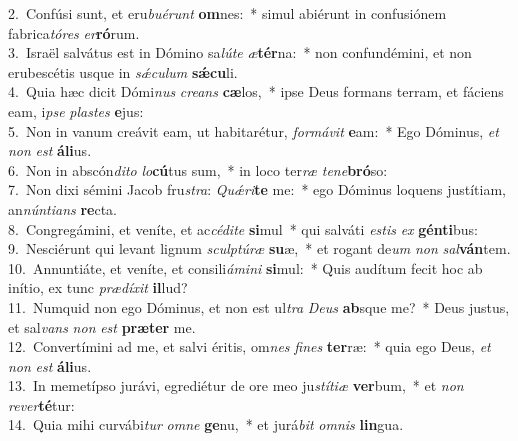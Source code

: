 {2.~}Confúsi sunt, et eru\textit{bu}\textit{é}\textit{runt} \textbf{om}nes:~* simul abiérunt in confusiónem fabrica\textit{tó}\textit{res} \textit{er}\textbf{ró}rum.\\
{3.~}Israël salvátus est in Dómino sa\textit{lú}\textit{te} \textit{æ}\textbf{tér}na:~* non confundémini, et non erubescétis usque in \textit{sǽ}\textit{cu}\textit{lum} \textbf{sǽ}\textbf{cu}li.\\
{4.~}Quia hæc dicit Dómi\textit{nus} \textit{cre}\textit{ans} \textbf{cæ}los,~* ipse Deus formans terram, et fáciens eam, i\textit{pse} \textit{pla}\textit{stes} \textbf{e}jus:\\
{5.~}Non in vanum creávit eam, ut habitarétur, \textit{for}\textit{má}\textit{vit} \textbf{e}am:~* Ego Dóminus, \textit{et} \textit{non} \textit{est} \textbf{á}\textbf{li}us.\\
{6.~}Non in abscón\textit{di}\textit{to} \textit{lo}\textbf{cú}tus sum,~* in loco ter\textit{ræ} \textit{te}\textit{ne}\textbf{bró}so:\\
{7.~}Non dixi sémini Jacob fru\textit{stra}: \textit{Quǽ}\textit{ri}\textbf{te} me:~* ego Dóminus loquens justítiam, an\textit{nún}\textit{ti}\textit{ans} \textbf{re}cta.\\
{8.~}Congregámini, et veníte, et ac\textit{cé}\textit{di}\textit{te} \textbf{si}mul~* qui salváti \textit{e}\textit{stis} \textit{ex} \textbf{gén}\textbf{ti}bus:\\
{9.~}Nesciérunt qui levant lignum \textit{scul}\textit{ptú}\textit{ræ} \textbf{su}æ,~* et rogant de\textit{um} \textit{non} \textit{sal}\textbf{ván}tem.\\
{10.~}Annuntiáte, et veníte, et consili\textit{á}\textit{mi}\textit{ni} \textbf{si}mul:~* Quis audítum fecit hoc ab inítio, ex tunc \textit{præ}\textit{dí}\textit{xit} \textbf{il}lud?\\
{11.~}Numquid non ego Dóminus, et non est ul\textit{tra} \textit{De}\textit{us} \textbf{ab}sque me?~* Deus justus, et sal\textit{vans} \textit{non} \textit{est} \textbf{præ}\textbf{ter} me.\\
{12.~}Convertímini ad me, et salvi éritis, om\textit{nes} \textit{fi}\textit{nes} \textbf{ter}ræ:~* quia ego Deus, \textit{et} \textit{non} \textit{est} \textbf{á}\textbf{li}us.\\
{13.~}In memetípso jurávi, egrediétur de ore meo ju\textit{stí}\textit{ti}\textit{æ} \textbf{ver}bum,~* et \textit{non} \textit{re}\textit{ver}\textbf{té}tur:\\
{14.~}Quia mihi curvábi\textit{tur} \textit{om}\textit{ne} \textbf{ge}nu,~* et jurá\textit{bit} \textit{om}\textit{nis} \textbf{lin}gua.\\
